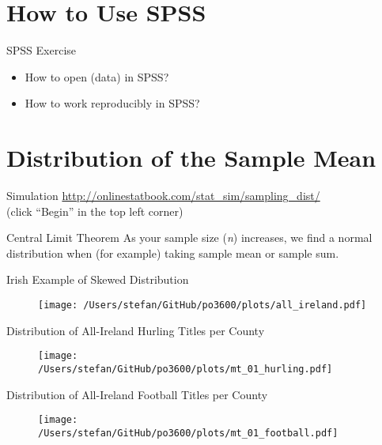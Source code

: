 \documentclass[10pt]{beamer}
\begin{document}
\section{How to Use SPSS}
\begin{frame}{SPSS Exercise}
\begin{itemize}
\item How to open (data) in SPSS?
\item How to work reproducibly in SPSS?
\end{itemize}
\end{frame}

\section{Distribution of the Sample Mean}

\begin{frame}{Simulation}
\url{http://onlinestatbook.com/stat_sim/sampling_dist/} \\
(click ``Begin'' in the top left corner)
\end{frame}

\begin{frame}{Central Limit Theorem}
As your sample size (\textit{n}) increases, we find a normal distribution when (for example) taking sample mean or sample sum.

\end{frame}

\begin{frame}{Irish Example of Skewed Distribution}
\pause
\begin{figure} \centering
\texttt{[image: /Users/stefan/GitHub/po3600/plots/all\_ireland.pdf]}
\end{figure}
\end{frame}

\begin{frame}{Distribution of All-Ireland Hurling Titles per County}

\begin{figure} \centering
\texttt{[image: /Users/stefan/GitHub/po3600/plots/mt\_01\_hurling.pdf]}
\end{figure}
\end{frame}

\begin{frame}{Distribution of All-Ireland Football Titles per County}

\begin{figure} \centering
\texttt{[image: /Users/stefan/GitHub/po3600/plots/mt\_01\_football.pdf]}
\end{figure}
\end{frame}
\end{document}
